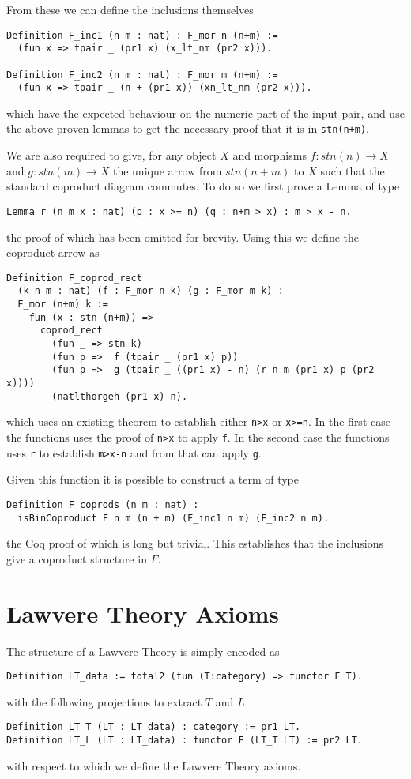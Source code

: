 From these we can define the inclusions themselves
\begin{lstlisting}
Definition F_inc1 (n m : nat) : F_mor n (n+m) := 
  (fun x => tpair _ (pr1 x) (x_lt_nm (pr2 x))).

Definition F_inc2 (n m : nat) : F_mor m (n+m) := 
  (fun x => tpair _ (n + (pr1 x)) (xn_lt_nm (pr2 x))).
\end{lstlisting}
which have the expected behaviour on the numeric part of the input pair, and use
the above proven lemmas to get the necessary proof that it is in
\lstinline|stn(n+m)|.

We are also required to give, for any object $X$ and morphisms $f: stn(n)\to X$
and $g: stn(m)\to X$ the unique arrow from $stn(n+m)$ to $X$ such that the
standard coproduct diagram commutes. To do so we first prove a Lemma of type
\begin{lstlisting}
Lemma r (n m x : nat) (p : x >= n) (q : n+m > x) : m > x - n.
\end{lstlisting}
the proof of which has been omitted for brevity. Using this we define the
coproduct arrow as
\begin{lstlisting}
Definition F_coprod_rect 
  (k n m : nat) (f : F_mor n k) (g : F_mor m k) : 
  F_mor (n+m) k :=
    fun (x : stn (n+m)) => 
      coprod_rect 
        (fun _ => stn k)
        (fun p =>  f (tpair _ (pr1 x) p))
        (fun p =>  g (tpair _ ((pr1 x) - n) (r n m (pr1 x) p (pr2 x))))
        (natlthorgeh (pr1 x) n).
\end{lstlisting}
which uses an existing theorem to establish either \lstinline|n>x| or
\lstinline|x>=n|. In the first case the functions uses the proof of
\lstinline|n>x| to apply \lstinline|f|. In the second case the functions uses
\lstinline|r| to establish \lstinline|m>x-n| and from that can apply
\lstinline|g|.

Given this function it is possible to construct a term of type
\begin{lstlisting}
Definition F_coprods (n m : nat) : 
  isBinCoproduct F n m (n + m) (F_inc1 n m) (F_inc2 n m).
\end{lstlisting}
the Coq proof of which is long but trivial. This establishes that the inclusions
give a coproduct structure in $F$.

\section{Lawvere Theory Axioms}
The structure of a Lawvere Theory is simply encoded as
\begin{lstlisting}
Definition LT_data := total2 (fun (T:category) => functor F T).
\end{lstlisting}
with the following projections to extract $T$ and $L$
\begin{lstlisting}
Definition LT_T (LT : LT_data) : category := pr1 LT.
Definition LT_L (LT : LT_data) : functor F (LT_T LT) := pr2 LT.
\end{lstlisting}
with respect to which we define the Lawvere Theory axioms.

